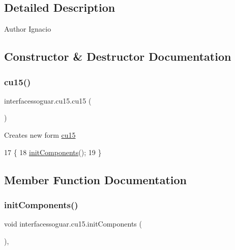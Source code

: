 \subsection{Detailed Description}
\begin{DoxyAuthor}{Author}
Ignacio 
\end{DoxyAuthor}


\subsection{Constructor \& Destructor Documentation}
\mbox{\label{classinterfacessoguar_1_1cu15_ad7d9907f41ebfa566258331685fb979d}} 
\subsubsection{\texorpdfstring{cu15()}{cu15()}}
{\footnotesize\ttfamily interfacessoguar.\+cu15.\+cu15 (\begin{DoxyParamCaption}{ }\end{DoxyParamCaption})\hspace{0.3cm}{\ttfamily [inline]}}

Creates new form \mbox{\hyperlink{classinterfacessoguar_1_1cu15}{cu15}} 
\begin{DoxyCode}
17                   \{
18         \mbox{\hyperlink{classinterfacessoguar_1_1cu15_a56f82e93f1ba9008728e1abb9f08b8cf}{initComponents}}();
19     \}
\end{DoxyCode}


\subsection{Member Function Documentation}
\mbox{\label{classinterfacessoguar_1_1cu15_a56f82e93f1ba9008728e1abb9f08b8cf}} 
\subsubsection{\texorpdfstring{init\+Components()}{initComponents()}}
{\footnotesize\ttfamily void interfacessoguar.\+cu15.\+init\+Components (\begin{DoxyParamCaption}{ }\end{DoxyParamCaption})\hspace{0.3cm}{\ttfamily [inline]}, {\ttfamily [private]}}

